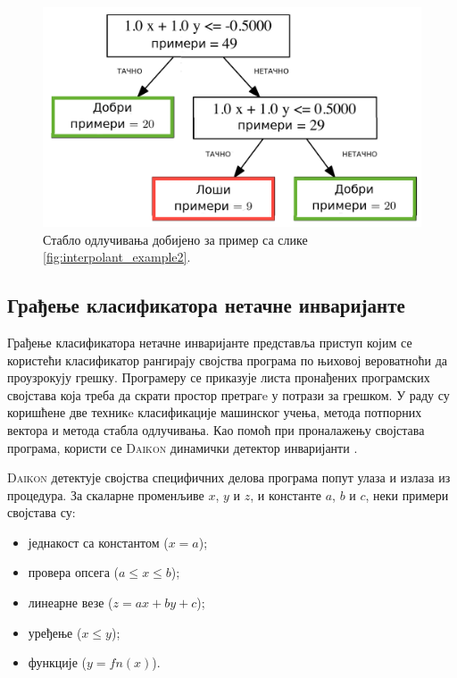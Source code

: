 \documentclass[a4paper]{article}
\begin{document}
{\begin{figure}[h!]
\begin{center}
\includegraphics[scale=0.14]{./slike/stablo_odlucivanja.png}
\end{center}
    \caption{Стабло одлучивања добијено за пример са слике \ref{fig:interpolant_example2}.}
\label{fig:interpolant_dt}
\end{figure}

\subsection{Грађење класификатора нетачне инваријанте}
\label{ssec:latent_dt}

Грађење класификатора нетачне инваријанте \cite{Brun04findinglatent} представља приступ којим се користећи класификатор рангирају
својства програма по њиховој вероватноћи да проузрокују грешку. Програмеру се приказује листа пронађених
програмских својстава која треба да скрати простор претрагe у потрази за грешком. У раду су коришћене две техникe класификације
машинског учења, метода потпорних вектора и метода стабла одлучивања. Као помоћ при проналажењу својстава програма, користи
се \textsc{Daikon} динамички детектор инваријанти \cite{Daikon}.

\textsc{Daikon} детектује својства специфичних делова програма попут улаза и излаза из процедура.
За скаларне променљиве $x$, $y$ и $z$, и константе $a$, $b$ и $c$, неки примери својстава су:
\begin{itemize}
    \item једнакост са константом ($x = a$);
    \item провера опсега ($a \leq x \leq b$);
    \item линеарне везе ($z = ax + by + c$);
    \item уређење ($x \leq y$);
    \item функције ($y = fn(x)$).
\end{itemize}

}
\end{document}
